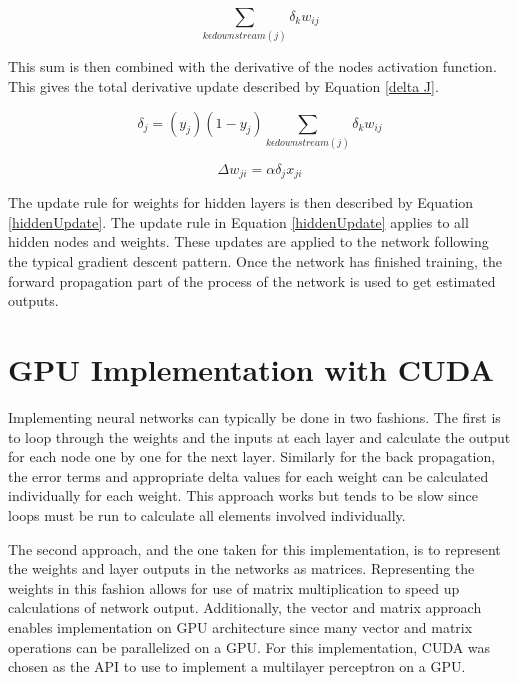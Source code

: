 \documentclass[jair, twoside,11pt,theapa]{article}
\begin{document}
\begin{equation}
\label{contribError}
\sum_{k \epsilon downstream(j)} \delta_k w_{ij}
\end{equation}

This sum is then combined with the derivative of the nodes activation function. 
This gives the total derivative update described by Equation \ref{delta J}.

\begin{equation}
\label{delta J}
\delta_j = (y_j)(1-y_j)\sum_{k \epsilon downstream(j)} \delta_k w_{ij}
\end{equation}

\begin{equation}
\label{hiddenUpdate}
\Delta w_{ji} = \alpha \delta_j x_{ji}
\end{equation}

The update rule for weights for hidden layers is then described by Equation \ref{hiddenUpdate}. 
The update rule in Equation \ref{hiddenUpdate} applies to all hidden nodes and weights. 
These updates are applied to the network following the typical gradient descent pattern. 
Once the network has finished training, the forward propagation part of the process of the network is used to get estimated outputs.

\section{GPU Implementation with CUDA}
\label{GPU}
Implementing neural networks can typically be done in two fashions. 
The first is to loop through the weights and the inputs at each layer and calculate the output for each node one by one for the next layer. 
Similarly for the back propagation, the error terms and appropriate delta values for each weight can be calculated individually for each weight. 
This approach works but tends to be slow since loops must be run to calculate all elements involved individually. 

The second approach, and the one taken for this implementation, is to represent the weights and layer outputs in the networks as matrices. 
Representing the weights in this fashion allows for use of matrix multiplication to speed up calculations of network output. 
Additionally, the vector and matrix approach enables implementation on GPU architecture since many vector and matrix operations can be parallelized on a GPU. 
For this implementation, CUDA was chosen as the API to use to implement a multilayer perceptron on a GPU. 
\end{document}
